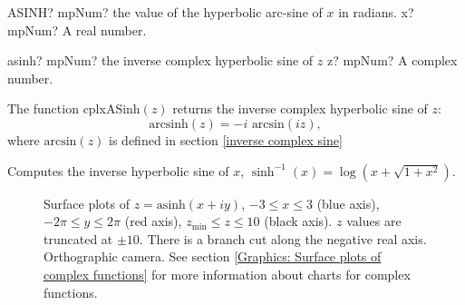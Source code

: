 \begin{mpFunctionsExtract}
	\mpWorksheetFunctionOneNotImplemented
	{ASINH? mpNum? the value of the hyperbolic arc-sine  of $x$ in radians.}
	{x? mpNum? A real number.}
\end{mpFunctionsExtract}

\vspace{0.6cm}


\begin{mpFunctionsExtract}
	\mpFunctionOne
	{asinh? mpNum? the inverse complex hyperbolic sine of $z$}
	{z? mpNum? A complex number.}
\end{mpFunctionsExtract}

\vspace{0.3cm}
The function \textsf{cplxASinh$(z)$} returns the inverse complex hyperbolic sine of $z$: 
\begin{equation}
	\text{arcsinh}(z) = -i \text{ arcsin}(iz),
\end{equation}
where $\text{arcsin}(z)$ is defined in section \ref{inverse complex sine}

Computes the inverse hyperbolic sine of $x$, $\sinh^{-1}(x)=\log(x+\sqrt{1+x^2})$.


\begin{figure}[ht]%
	\centering
	\qquad
	\caption[Complex Inverse Hyperbolic Sine]{Surface plots of $z = \text{asinh}(x + iy)$, $-3 \leq x \leq 3$ (blue axis), $-2 \pi \leq y \leq 2\pi$ (red axis), $z_{\text{min}} \leq z \leq 10$ (black axis). $z$ values are truncated at $\pm 10$. There is a branch cut along the negative real axis. Orthographic camera. See section \ref{Graphics: Surface plots of complex functions} for more information about charts for complex functions.} 
	\label{fig:Complex Inverse Hyperbolic Sine}%
\end{figure}




